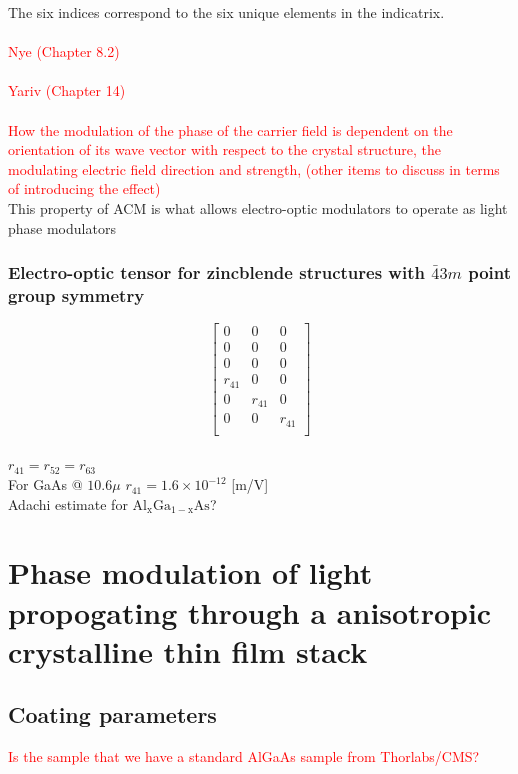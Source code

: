 The six indices correspond to the six unique elements in the indicatrix.
\\
\\
\textcolor{red}{Nye (Chapter 8.2)}
\\
\\
\textcolor{red}{Yariv (Chapter 14)}
\\
\\
\textcolor{red}{ How the modulation of the phase of the carrier field is dependent on the orientation of its wave vector with respect to the crystal structure, the modulating electric field direction and strength, (other items to discuss in terms of introducing the effect)}
\\
This property of ACM is what allows electro-optic modulators to operate as light phase modulators

\subsubsection{Electro-optic tensor for zincblende structures with $\bar{4}3m$ point group symmetry}
\begin{equation}
 \left[ {\begin{array}{ccc}
   0 & 0 & 0\\
   0 & 0 & 0\\
   0 & 0 & 0\\
   r_{41} & 0 & 0\\
   0 & r_{41} & 0\\
   0 & 0 & r_{41}\\
  \end{array} } \right]
\end{equation}
\\
$r_{41} = r_{52} = r_{63}$
\\
For GaAs @ $10.6\mu$ $r_{41} = 1.6 \times 10^{-12}$ [m/V]
\\
Adachi estimate for $\mathrm{Al_{x}Ga_{1-x}As}$?



\section{Phase modulation of light propogating through a anisotropic crystalline thin film stack}

\subsection{Coating parameters}

\textcolor{red}{Is the sample that we have a standard AlGaAs sample from Thorlabs/CMS?}


